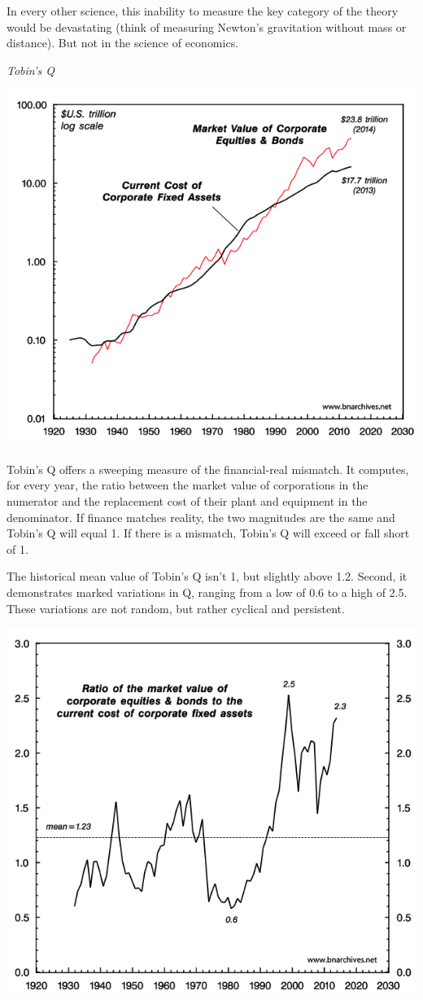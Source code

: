 \documentclass[
]{book}
\begin{document}
In every other science, this inability to measure the key category of the theory would be devastating (think of measuring Newton's gravitation without mass or distance). But not in the science of economics.

\emph{Tobin's Q}

\includegraphics{fig/Quantity_of_US_Capital.png}

Tobin's Q offers a sweeping measure of the financial-real mismatch. It computes, for every year, the ratio between the market value of corporations in the numerator and the replacement cost of their plant and equipment in the denominator. If finance matches reality, the two magnitudes are the same and Tobin's Q will equal 1. If there is a mismatch, Tobin's Q will exceed or fall short of 1.

The historical mean value of Tobin's Q isn't 1, but slightly above 1.2. Second, it demonstrates marked variations in Q, ranging from a low of 0.6 to a high of 2.5. These variations are not random, but rather cyclical and persistent.

\includegraphics{fig/Tobins_Q_US.png}
\end{document}
